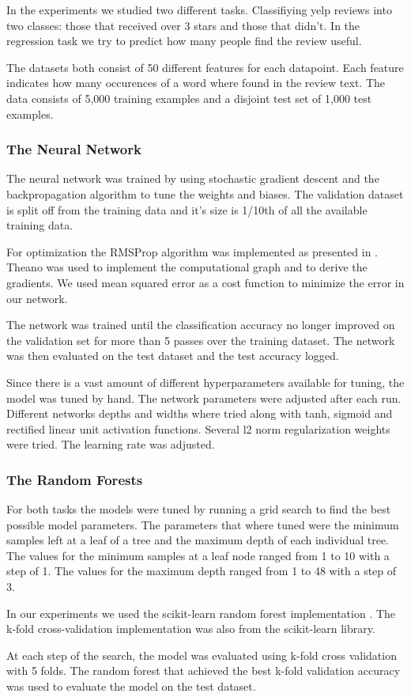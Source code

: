 
In the experiments we studied two different tasks. Classifiying yelp reviews into two classes: those that received over 3 stars and those that didn't. In the regression task we try to predict how many people find the review useful.

The datasets both consist of 50 different features for each datapoint. Each feature indicates how many occurences of a word where found in the review text. The data consists of 5,000 training examples and a disjoint test set of 1,000 test examples.

\subsubsection{The Neural Network}

The neural network was trained by using stochastic gradient descent and the backpropagation algorithm to tune the weights and biases. The validation dataset is split off from the training data and it's size is 1/10th of all the available training data.

For optimization the RMSProp algorithm was implemented as presented in \cite{deep-learning-book}. Theano \cite{theano} was used to implement the computational graph and to derive the gradients. We used mean squared error as a cost function to minimize the error in our network.

The network was trained until the classification accuracy no longer improved on the validation set for more than 5 passes over the training dataset. The network was then evaluated on the test dataset and the test accuracy logged.

Since there is a vast amount of different hyperparameters available for tuning, the model was tuned by hand. The network parameters were adjusted after each run. Different networks depths and widths where tried along with tanh, sigmoid and rectified linear unit activation functions. Several l2 norm regularization weights were tried. The learning rate was adjusted.

\subsubsection{The Random Forests}


For both tasks the models were tuned by running a grid search to find the best possible model parameters. The parameters that where tuned were the minimum samples left at a leaf of a tree and the maximum depth of each individual tree. The values for the minimum samples at a leaf node ranged from 1 to 10 with a step of 1. The values for the maximum depth ranged from 1 to 48 with a step of 3.

In our experiments we used the scikit-learn random forest implementation \cite{sklearn}. The k-fold cross-validation implementation was also from the scikit-learn library.

At each step of the search, the model was evaluated using k-fold cross validation with 5 folds. The random forest that achieved the best k-fold validation accuracy was used to evaluate the model on the test dataset.


